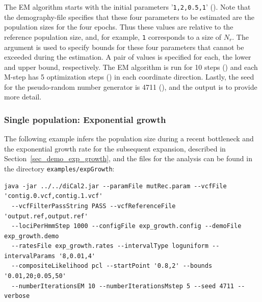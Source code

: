 \documentclass{article}
\numberwithin{equation}{section}
\begin{document}
The EM algorithm starts with the initial parameters '\texttt{1,2,0.5,1}' (). Note that the demography-file specifies that these four parameters to be estimated are the population sizes for the four epochs. Thus these values are relative to the reference population size, and, for example, \texttt{1} corresponds to a size of $N_r$. The argument  is used to specify bounds for these four parameters that cannot be exceeded during the estimation. A pair of values is specified for each, the lower and upper bound, respectively. The EM algorithm is run for 10 steps () and each M-step has 5 optimization steps () in each coordinate direction. Lastly, the seed for the pseudo-random number generator is 4711 (), and the output is  to provide more detail.

\subsubsection{Single population: Exponential growth}

The following example infers the population size during a recent bottleneck and the exponential growth rate for the subsequent expansion, described in Section~\ref{sec_demo_exp_growth}, and the files for the analysis can be found in the directory \texttt{examples/expGrowth}:

\begin{verbatim}
java -jar ../../diCal2.jar --paramFile mutRec.param --vcfFile 'contig.0.vcf,contig.1.vcf'
  --vcfFilterPassString PASS --vcfReferenceFile 'output.ref,output.ref'
  --lociPerHmmStep 1000 --configFile exp_growth.config --demoFile exp_growth.demo
  --ratesFile exp_growth.rates --intervalType loguniform --intervalParams '8,0.01,4'
  --compositeLikelihood pcl --startPoint '0.8,2' --bounds '0.01,20;0.05,50'
  --numberIterationsEM 10 --numberIterationsMstep 5 --seed 4711 --verbose
\end{verbatim}
\end{document}
